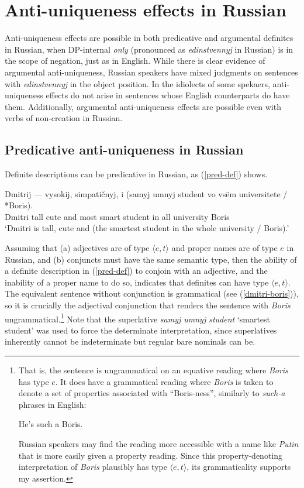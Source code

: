 \section{Anti-uniqueness effects in Russian \label{sec:anti-unique-ru}}
Anti-uniqueness effects are possible in both predicative and argumental definites in Russian, when DP-internal \textit{only} (pronounced as \textit{edinstvennyj} in Russian) is in the scope of negation, just as in English. While there is clear evidence of argumental anti-uniqueness, Russian speakers have mixed judgments on sentences with \textit{edinstvennyj} in the object position. In the idiolects of some spekaers, anti-uniqueness effects do not arise in sentences whose English counterparts do have them. Additionally, argumental anti-uniqueness effects are possible even with verbs of non-creation in Russian.

\subsection{Predicative anti-uniqueness in Russian}
Definite descriptions can be predicative in Russian, as (\ref{pred-def}) shows.

\begin{exe}
	\ex \label{pred-def} \gll Dmitrij --- vysokij, simpati\v{c}nyj, i (samyj umnyj student vo vs\"{e}m universitete / *Boris).\\
	Dmitri {} tall cute and most smart student in all university {} Boris\\
	\glt `Dmitri is tall, cute and (the smartest student in the whole university / Boris).'
\end{exe}

Assuming that (a) adjectives are of type $\langle e, t \rangle$ and proper names are of type $e$ in Russian, and (b) conjuncts must have the same semantic type, then the ability of a definite description in (\ref{pred-def}) to conjoin with an adjective, and the inability of a proper name to do so, indicates that definites can have type $\langle e, t \rangle$. The equivalent sentence without conjunction is grammatical (see (\ref{dmitri-boris})), so it is crucially the adjectival conjunction that renders the sentence with \textit{Boris} ungrammatical.\footnote{That is, the sentence is ungrammatical on an equative reading where \textit{Boris} has type $e$. It does have a grammatical reading where \textit{Boris} is taken to denote a set of properties associated with ``Boris-ness'', similarly to \textit{such-a} phrases in English: \begin{exe} \ex He's such a Boris.\end{exe} Russian speakers may find the reading more accessible with a name like \textit{Putin} that is more easily given a property reading. Since this property-denoting interpretation of \textit{Boris} plausibly has type $\langle e, t \rangle$, its grammaticality supports my assertion.} Note that the superlative \textit{samyj umnyj student} `smartest student' was used to force the determinate interpretation, since superlatives inherently cannot be indeterminate but regular bare nominals can be.


